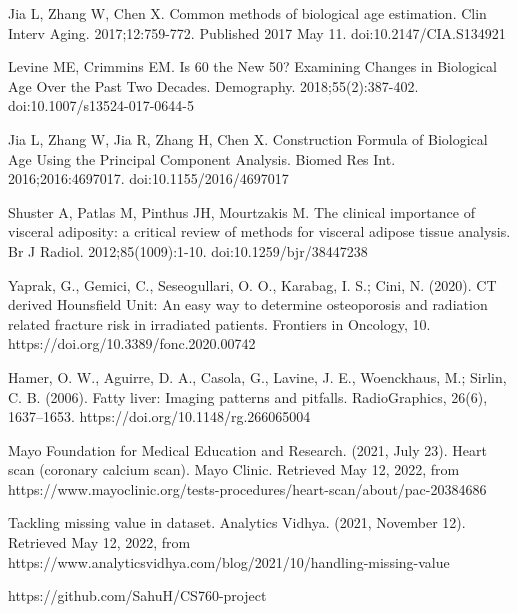 \begin{thebibliography}{9}

Jia L, Zhang W, Chen X. Common methods of biological age estimation. Clin Interv Aging. 2017;12:759-772. Published 2017 May 11. doi:10.2147/CIA.S134921

Levine ME, Crimmins EM. Is 60 the New 50? Examining Changes in Biological Age Over the Past Two Decades. Demography. 2018;55(2):387-402. doi:10.1007/s13524-017-0644-5

Jia L, Zhang W, Jia R, Zhang H, Chen X. Construction Formula of Biological Age Using the Principal Component Analysis. Biomed Res Int. 2016;2016:4697017. doi:10.1155/2016/4697017

Shuster A, Patlas M, Pinthus JH, Mourtzakis M. The clinical importance of visceral adiposity: a critical review of methods for visceral adipose tissue analysis. Br J Radiol. 2012;85(1009):1-10. doi:10.1259/bjr/38447238

Yaprak, G., Gemici, C., Seseogullari, O. O., Karabag, I. S.; Cini, N. (2020). CT derived Hounsfield Unit: An easy way to determine osteoporosis and radiation related fracture risk in irradiated patients. Frontiers in Oncology, 10. https://doi.org/10.3389/fonc.2020.00742

Hamer, O. W., Aguirre, D. A., Casola, G., Lavine, J. E., Woenckhaus, M.; Sirlin, C. B. (2006). Fatty liver: Imaging patterns and pitfalls. RadioGraphics, 26(6), 1637–1653. https://doi.org/10.1148/rg.266065004 

Mayo Foundation for Medical Education and Research. (2021, July 23). Heart scan (coronary calcium scan). Mayo Clinic. Retrieved May 12, 2022, from https://www.mayoclinic.org/tests-procedures/heart-scan/about/pac-20384686

Tackling missing value in dataset. Analytics Vidhya. (2021, November 12). Retrieved May 12, 2022, from https://www.analyticsvidhya.com/blog/2021/10/handling-missing-value

https://github.com/SahuH/CS760-project

\end{thebibliography}